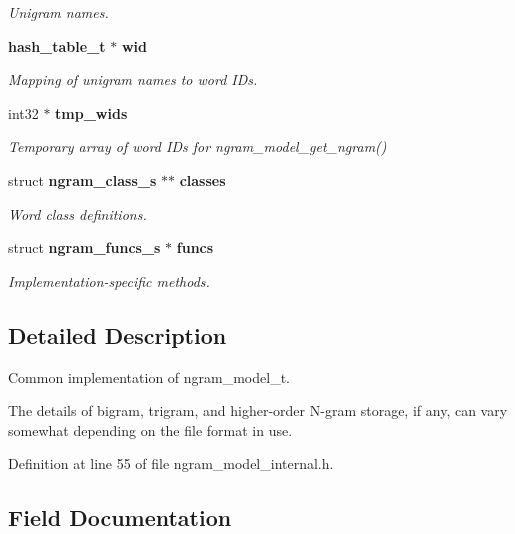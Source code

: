 \begin{DoxyCompactItemize}
\begin{DoxyCompactList}\small\item\em Unigram names. \end{DoxyCompactList}\item 
{\bf hash\+\_\+table\+\_\+t} $\ast$ {\bf wid}
\begin{DoxyCompactList}\small\item\em Mapping of unigram names to word I\+Ds. \end{DoxyCompactList}\item 
int32 $\ast$ {\bf tmp\+\_\+wids}\label{structngram__model__s_a4f910ab2c18b0e68dce92816a27fb139}

\begin{DoxyCompactList}\small\item\em Temporary array of word I\+Ds for ngram\+\_\+model\+\_\+get\+\_\+ngram() \end{DoxyCompactList}\item 
struct {\bf ngram\+\_\+class\+\_\+s} $\ast$$\ast$ {\bf classes}
\begin{DoxyCompactList}\small\item\em Word class definitions. \end{DoxyCompactList}\item 
struct {\bf ngram\+\_\+funcs\+\_\+s} $\ast$ {\bf funcs}
\begin{DoxyCompactList}\small\item\em Implementation-\/specific methods. \end{DoxyCompactList}\end{DoxyCompactItemize}


\subsection{Detailed Description}
Common implementation of ngram\+\_\+model\+\_\+t. 

The details of bigram, trigram, and higher-\/order N-\/gram storage, if any, can vary somewhat depending on the file format in use. 

Definition at line 55 of file ngram\+\_\+model\+\_\+internal.\+h.



\subsection{Field Documentation}
